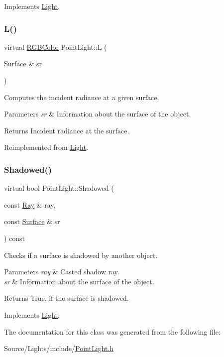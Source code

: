 Implements \hyperlink{class_light_a62c5f73131ca1cdd6b2477f36c242482}{Light}.

\hypertarget{class_point_light_a0d5e1227bc28f5a26edb595fe443f7f3}{}\label{class_point_light_a0d5e1227bc28f5a26edb595fe443f7f3} 
\subsubsection{\texorpdfstring{L()}{L()}}
{\footnotesize\ttfamily virtual \hyperlink{class_r_g_b_color}{R\+G\+B\+Color} Point\+Light\+::L (\begin{DoxyParamCaption}\item[{\hyperlink{class_surface}{Surface} \&}]{sr }\end{DoxyParamCaption})\hspace{0.3cm}{\ttfamily [virtual]}}

Computes the incident radiance at a given surface. 
\begin{DoxyParams}{Parameters}
{\em sr} & Information about the surface of the object. \\
\hline
\end{DoxyParams}
\begin{DoxyReturn}{Returns}
Incident radiance at the surface. 
\end{DoxyReturn}


Reimplemented from \hyperlink{class_light_aba4ca1dcd52876cb5bee71ac8f684af5}{Light}.

\hypertarget{class_point_light_aa4a50b149cdc22acbf2140a7e2ff9551}{}\label{class_point_light_aa4a50b149cdc22acbf2140a7e2ff9551} 
\subsubsection{\texorpdfstring{Shadowed()}{Shadowed()}}
{\footnotesize\ttfamily virtual bool Point\+Light\+::\+Shadowed (\begin{DoxyParamCaption}\item[{const \hyperlink{class_ray}{Ray} \&}]{ray,  }\item[{const \hyperlink{class_surface}{Surface} \&}]{sr }\end{DoxyParamCaption}) const\hspace{0.3cm}{\ttfamily [virtual]}}

Checks if a surface is shadowed by another object. 
\begin{DoxyParams}{Parameters}
{\em ray} & Casted shadow ray. \\
\hline
{\em sr} & Information about the surface of the object. \\
\hline
\end{DoxyParams}
\begin{DoxyReturn}{Returns}
True, if the surface is shadowed. 
\end{DoxyReturn}


Implements \hyperlink{class_light_ac96c5efcdccb339609c7d19ea6ac5d17}{Light}.



The documentation for this class was generated from the following file\+:\begin{DoxyCompactItemize}
\item 
Source/\+Lights/include/\hyperlink{_point_light_8h}{Point\+Light.\+h}\end{DoxyCompactItemize}

